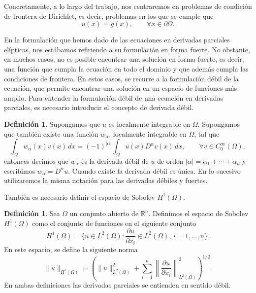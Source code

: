 \documentclass[a4paper,11pt,spanish, twoside, leqno]{tfg-uam}
\theoremstyle{definition}
\newtheorem{defin}[teor]{Definici\'on}
\begin{document}
Concretamente, a lo largo del trabajo, nos centraremos en problemas de condición de frontera de Dirichlet, es decir, problemas en los que se cumple que
\begin{equation}
    u(x) = g(x), \qquad \forall x\in\partial\Omega.
\end{equation}

En la formulación que hemos dado de las ecuaciones en derivadas parciales elípticas, nos estábamos refiriendo a su formulación en forma fuerte. No obstante, en muchos casos, no es posible encontrar una solución en forma fuerte, es decir, una función que cumpla la ecuación en todo el dominio y que además cumpla las condiciones de frontera. En estos casos, se recurre a la  formulación débil de la ecuación, que permite encontrar una solución en un espacio de funciones más amplio. Para entender la formulación débil de una ecuación en derivadas parciales, es necesario introducir el concepto de derivada débil.

\begin{mdframed}
    \begin{defin}
        Supongamos que $u$ es localmente integrable en $\Omega$. Supongamos que también existe una función $w_\alpha$, localmente integrable en $\Omega$, tal que
        \begin{equation*}
            \int_\Omega w_\alpha(x)v(x) \, dx = (-1)^{|\alpha|} \int_\Omega u(x)D^\alpha v(x) \, dx, \qquad \forall v \in C_0^\infty(\Omega),
        \end{equation*}
        entonces decimos que $w_\alpha$ es la derivada débil de $u$ de orden $|\alpha| = \alpha_1 + \cdots + \alpha_n$ y escribimos $w_\alpha = D^\alpha u$. Cuando existe la derivada débil es única. En lo sucesivo utilizaremos la misma notación para las derivadas débiles y fuertes.
    \end{defin}
\end{mdframed}
También es necesario definir el espacio de Sobolev $H^1(\Omega)$.
\begin{mdframed}
\begin{defin}
    Sea $\Omega$ un conjunto abierto de $\mathbb{R}^n$. Definimos el espacio de Sobolev $H^1(\Omega)$ como el conjunto de funciones en el siguiente conjunto
    \begin{equation}
        H^1(\Omega)=\{u\in L^2(\Omega): \frac{\partial u}{\partial x_i}\in L^2(\Omega), \, i=1,\dots,n\}.
    \end{equation}
    En este espacio, se define la siguiente norma
    \begin{equation}
        \|u\|_{H^1(\Omega)}=\left(\|u\|^2_{L^2(\Omega)} + \sum_{i=1}^{n}\left\|\frac{\partial u}{\partial x_i}\right\|^2_{L^2(\Omega)}\right)^{1/2}.
    \end{equation}
    En ambas definiciones las derivadas parciales se entienden en sentido débil.
\end{defin}
\end{mdframed}
    
\end{document}
